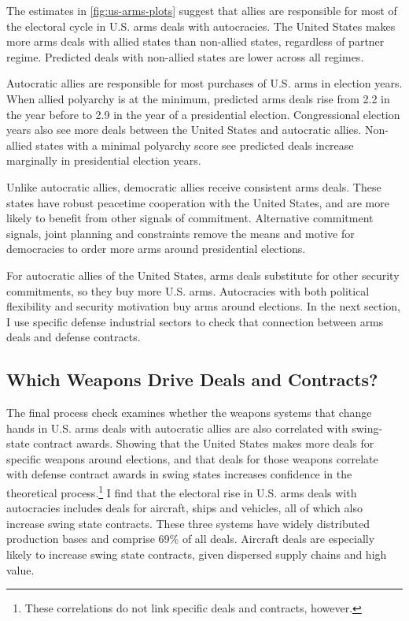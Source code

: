 \documentclass[12pt]{article}
\begin{document}
The estimates in \autoref{fig:us-arms-plots} suggest that allies are responsible for most of the electoral cycle in U.S. arms deals with autocracies. 
The United States makes more arms deals with allied states than non-allied states, regardless of partner regime. 
Predicted deals with non-allied states are lower across all regimes. 


Autocratic allies are responsible for most purchases of U.S. arms in election years. 
When allied polyarchy is at the minimum, predicted arms deals rise from 2.2 in the year before to 2.9 in the year of a presidential election. 
Congressional election years also see more deals between the United States and autocratic allies. 
Non-allied states with a minimal polyarchy score see predicted deals increase marginally in presidential election years.


Unlike autocratic allies, democratic allies receive consistent arms deals. 
These states have robust peacetime cooperation with the United States, and are more likely to benefit from other signals of commitment.
Alternative commitment signals, joint planning and constraints remove the means and motive for democracies to order more arms around presidential elections.


For autocratic allies of the United States, arms deals substitute for other security commitments, so they buy more U.S. arms. 
Autocracies with both political flexibility and security motivation buy arms around elections. 
In the next section, I use specific defense industrial sectors to check that connection between arms deals and defense contracts. 



\subsection{Which Weapons Drive Deals and Contracts?} 


The final process check examines whether the weapons systems that change hands in U.S. arms deals with autocratic allies are also correlated with swing-state contract awards. 
Showing that the United States makes more deals for specific weapons around elections, and that deals for those weapons correlate with defense contract awards in swing states increases confidence in the theoretical process.\footnote{These correlations do not link specific deals and contracts, however.}
I find that the electoral rise in U.S. arms deals with autocracies includes deals for aircraft, ships and vehicles, all of which also increase swing state contracts. 
These three systems have widely distributed production bases and comprise 69\% of all deals. 
Aircraft deals are especially likely to increase swing state contracts, given dispersed supply chains and high value. 
\end{document}
